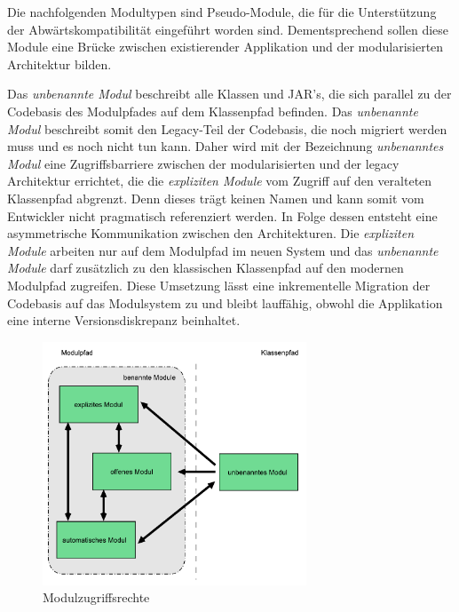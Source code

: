     Die nachfolgenden Modultypen sind Pseudo-Module, die für die Unterstützung der Abwärtskompatibilität eingeführt worden sind. 
    Dementsprechend sollen diese Module eine Brücke zwischen existierender Applikation und der modularisierten Architektur bilden.\bigbreak

    Das \textit{unbenannte Modul} beschreibt alle Klassen und JAR's, die sich parallel zu der Codebasis des Modulpfades auf dem Klassenpfad befinden. Das \textit{unbenannte Modul} beschreibt somit den Legacy-Teil der Codebasis, die noch migriert werden muss und es noch nicht tun kann. Daher wird mit der Bezeichnung \textit{unbenanntes Modul} eine Zugriffsbarriere zwischen der modularisierten und der legacy Architektur errichtet, die die \textit{expliziten Module} vom Zugriff auf den veralteten Klassenpfad abgrenzt. Denn dieses trägt keinen Namen und kann somit vom Entwickler nicht pragmatisch referenziert werden.\newline
    In Folge dessen entsteht eine asymmetrische Kommunikation zwischen den Architekturen. Die \textit{expliziten Module} arbeiten nur auf dem Modulpfad im neuen System und das \textit{unbenannte Module} darf zusätzlich zu den klassischen Klassenpfad auf den modernen Modulpfad zugreifen. Diese Umsetzung lässt eine inkrementelle Migration der Codebasis auf das Modulsystem zu und bleibt lauffähig, obwohl die Applikation eine interne Versionsdiskrepanz beinhaltet. \cite{modulMitJava9,java9modRevealed,modulProgJava9}

    \begin{figure}[h]
      \centering
      \includegraphics[width=0.7\textwidth]{material/images/module-access.pdf}
      \caption{Modulzugriffsrechte \cite{modulMitJava9}}
      \label{fig:modacc}
    \end{figure}

